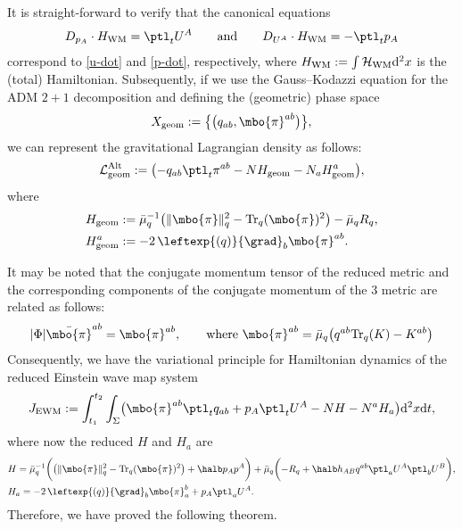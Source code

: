 It is straight-forward to verify that the canonical equations
\begin{align*}
D_{p_A}\cdot H_{{\rm WM}} = \ptl_t U^A \qquad \text{and} \qquad D_{U^A}\cdot H_{{\rm WM}} = - \ptl_t p_A
\end{align*}
correspond to \eqref{u-dot} and \eqref{p-dot}, respectively,
where $H_{{\rm WM}} := \int \mathcal{H}_{{\rm WM}} {\rm d}^2x $ is the (total) Hamiltonian. Subsequently, if we use the Gauss--Kodazzi equation for the ADM $2+1$ decomposition and defining the (geometric) phase space
\begin{align*}
X_{{\rm geom}} := \bigl\{ \bigl(q_{ab}, \mbo{\pi}^{ab}\bigr) \bigr\},
\end{align*}
 we can represent the gravitational Lagrangian density as follows:
\begin{align*}
\mathcal{L}^{{\rm Alt}}_{{\rm geom}} := \bigl(- q_{ab}\ptl_t \pi^{ab} - N H_{{\rm geom}} - N_a H_{{\rm geom}}^a\bigr),
\end{align*}
where
\begin{align*}
&H_{{\rm geom}}:= \bar{\mu}^{-1}_q \bigl(\Vert \mbo{\pi} \Vert_q^2 - {\rm Tr}_q(\mbo{\pi})^2 \bigr) - \bar{\mu}_q R_q, \\
&H_{{\rm geom}}^a := -2\, \leftexp{(q)}{\grad}_b \mbo{\pi}^{ab}.
\end{align*}

It may be noted that the conjugate momentum tensor of the reduced metric and the corresponding components of the conjugate momentum of the $3$ metric are related as follows:
\begin{align*}
 \vert \Phi \vert \bar{\mbo{\pi}}^{ab} = \mbo{\pi}^{ab}, \qquad \text{where} \ \mbo{\pi}^{ab} = \bar{\mu}_q \bigl(q^{ab} {\rm Tr}_q(K) - K^{ab} \bigr)
\end{align*}
Consequently, we have the variational principle for Hamiltonian dynamics of the reduced Einstein wave map system
\begin{align} \label{ham-var}
J_{{\rm EWM}} := \int^{t_2}_{t_1}\int_{\Sigma} \bigl(\mbo{\pi}^{ab} \ptl_t q_{ab} + p_A \ptl_t U^A - N H - N^a H_a \bigr) {\rm d}^2x {\rm d}t,
\end{align}
where now the reduced $H$ and $H_a$ are
\begin{align*}
&H= \bar{\mu}^{-1}_q \biggl(\bigl(\Vert \mbo{\pi} \Vert^2_q - {\rm Tr}_q (\mbo{\pi})^2 \bigr) + \halb p_A p^A \biggr) + \bar{\mu}_q \biggl(- R_q + \halb h_{AB} q^{ab} \ptl_a U^A \ptl_b U^B \biggr), \\
&H_a= - 2\, \leftexp{(q)}{\grad}_b \mbo{\pi}^b_a + p_A \ptl_a U^A.
\end{align*}
Therefore, we have proved the following theorem.

